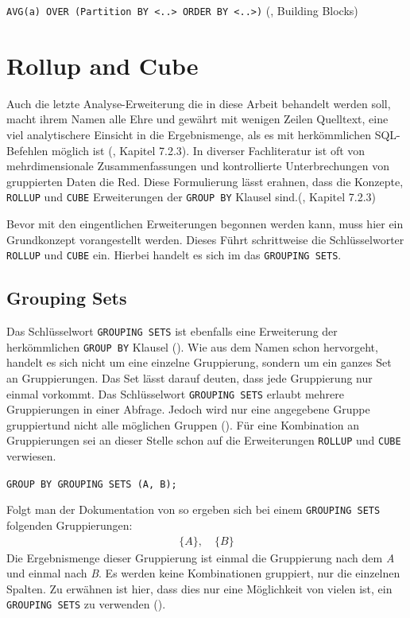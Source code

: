 \texttt{AVG(a) OVER (Partition BY <..> ORDER BY <..>)} (\cite{Nuijten2023}, Building
Blocks)


\section{Rollup and Cube}
Auch die letzte Analyse-Erweiterung die in diese Arbeit behandelt werden soll, macht
ihrem Namen alle Ehre und gewährt mit wenigen Zeilen Quelltext, eine viel
analytischere Einsicht in die Ergebnismenge, als es mit herkömmlichen SQL-Befehlen
möglich ist (\cite{melton2002advanced}, Kapitel 7.2.3). In diverser
Fachliteratur ist oft von mehrdimensionale Zusammenfassungen und kontrollierte
Unterbrechungen von gruppierten Daten die Red. Diese Formulierung lässt erahnen,
dass die Konzepte, \texttt{ROLLUP} und \texttt{CUBE} Erweiterungen der \texttt{GROUP
BY} Klausel sind.(\cite{melton2002advanced}, Kapitel 7.2.3)

Bevor mit den eingentlichen Erweiterungen begonnen werden kann, muss hier ein
Grundkonzept vorangestellt werden. Dieses Führt schrittweise die Schlüsselworter
\texttt{ROLLUP} und \texttt{CUBE} ein. Hierbei handelt es sich im das \texttt{GROUPING
SETS}.

\subsection{Grouping Sets}
Das Schlüsselwort \texttt{GROUPING SETS} ist ebenfalls eine Erweiterung der
herkömmlichen \texttt{GROUP BY} Klausel (\cite{oracle16}). Wie aus dem Namen
schon hervorgeht, handelt es sich nicht um eine einzelne Gruppierung, sondern um
ein ganzes Set an Gruppierungen. Das Set lässt darauf deuten, dass jede
Gruppierung nur einmal vorkommt. Das Schlüsselwort \texttt{GROUPING SETS}
erlaubt mehrere Gruppierungen in einer Abfrage. Jedoch wird nur eine angegebene Gruppe
gruppiertund nicht alle möglichen Gruppen (\cite{oracle16}). Für eine
Kombination an Gruppierungen sei an dieser Stelle schon auf die Erweiterungen
\texttt{ROLLUP} und \texttt{CUBE} verwiesen.

\texttt{GROUP BY GROUPING SETS (A, B);}

Folgt man der Dokumentation von \cite{oracle16} so ergeben sich bei einem
\texttt{GROUPING SETS} folgenden Gruppierungen:
\begin{align*}
	\{A\}, \quad \{B\}
\end{align*}
Die Ergebnismenge dieser Gruppierung ist einmal die Gruppierung nach dem \textit{A}
und einmal nach \textit{B}. Es werden keine Kombinationen gruppiert, nur die
einzelnen Spalten. Zu erwähnen ist hier, dass dies nur eine Möglichkeit von
vielen ist, ein \texttt{GROUPING SETS} zu verwenden (\cite{oracle16}).

